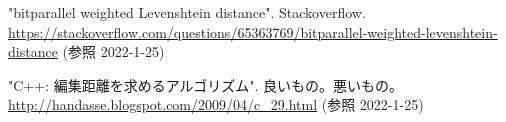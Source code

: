 \documentclass[dvipdfmx]{jsarticle}
\begin{document}
\begin{thebibliography}{99}
  \item "bitparallel weighted Levenshtein distance". Stackoverflow. \url{https://stackoverflow.com/questions/65363769/bitparallel-weighted-levenshtein-distance} (参照 2022-1-25)
  \item "C++: 編集距離を求めるアルゴリズム". 良いもの。悪いもの。 \url{http://handasse.blogspot.com/2009/04/c_29.html} (参照 2022-1-25)
\end{thebibliography}
\end{document}
